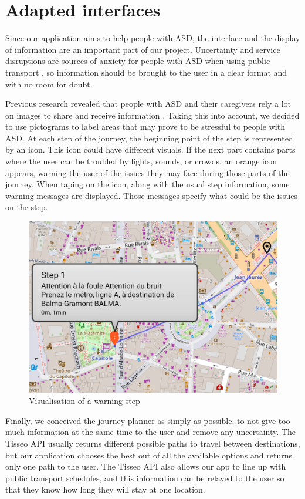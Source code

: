 \section{Adapted interfaces}


Since our application aims to help people with ASD, the interface and the display of information are an important part of our project. Uncertainty and service disruptions are sources of anxiety for people with ASD when using public transport \cite{2020ExperiencesYoungAutistic}, so information should be brought to the user in a clear format and with no room for doubt.


Previous research revealed that people with ASD and their caregivers rely a lot on images to share and receive information \cite{2018MobilityPoliciesExtraSmall}. Taking this into account, we decided to use pictograms to label areas that may prove to be stressful to people with ASD. At each step of the journey, the beginning point of the step is represented by an icon. This icon could have different visuals. If the next part contains parts where the user can be troubled by lights, sounds, or crowds, an orange icon appears, warning the user of the issues they may face during those parts of the journey. When taping on the icon, along with the usual step information, some warning messages are displayed. Those messages specify what could be the issues on the step.


\begin{figure}[h]
    \centering
    \includegraphics[scale=0.3]{img/step warning.png}
    \caption{Visualisation of a warning step}
    \label{fig:WarningStep}
\end{figure}


Finally, we conceived the journey planner as simply as possible, to not give too much information at the same time to the user and remove any uncertainty. The Tisseo API usually returns different possible paths to travel between destinations, but our application chooses the best out of all the available options and returns only one path to the user. The Tisseo API also allows our app to line up with public transport schedules, and this information can be relayed to the user so that they know how long they will stay at one location.
